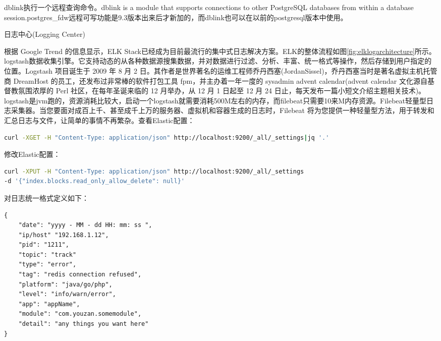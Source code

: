 \documentclass[8pt]{book}
\makeatletter
\numberwithin{dummy}{section}
\theoremstyle{ocrenumbox}
\theoremstyle{blacknumex}
\theoremstyle{blacknumbox}
\theoremstyle{ocrenum}
\renewcommand{\section}{\@startsection{section}{1}{\z@}
	{-4ex \@plus -1ex \@minus -.4ex}
	{1ex \@plus.2ex }
	{\normalfont\large\sffamily\bfseries}}
\makeatother
\begin{document}
dblink执行一个远程查询命令。dblink is a module that supports connections to other PostgreSQL databases from within a database session.postgres\_fdw远程可写功能是9.3版本出来后才新加的，而dblink也可以在以前的postgresql版本中使用。



\section{日志中心(Logging Center)}

根据 Google Trend 的信息显示，ELK Stack已经成为目前最流行的集中式日志解决方案。ELK的整体流程如图\ref{fig:elklogarchitecture}所示。logstash数据收集引擎。它支持动态的从各种数据源搜集数据，并对数据进行过滤、分析、丰富、统一格式等操作，然后存储到用户指定的位置。Logstash 项目诞生于 2009 年 8 月 2 日。其作者是世界著名的运维工程师乔丹西塞(JordanSissel)，乔丹西塞当时是著名虚拟主机托管商 DreamHost 的员工，还发布过非常棒的软件打包工具 fpm，并主办着一年一度的 sysadmin advent calendar(advent calendar 文化源自基督教氛围浓厚的 Perl 社区，在每年圣诞来临的 12 月举办，从 12 月 1 日起至 12 月 24 日止，每天发布一篇小短文介绍主题相关技术)。logstash是jvm跑的，资源消耗比较大，启动一个logstash就需要消耗500M左右的内存，而filebeat只需要10来M内存资源。Filebeat轻量型日志采集器。当您要面对成百上千、甚至成千上万的服务器、虚拟机和容器生成的日志时，Filebeat 将为您提供一种轻量型方法，用于转发和汇总日志与文件，让简单的事情不再繁杂。查看Elastic配置：

\begin{lstlisting}[language=Bash]
curl -XGET -H "Content-Type: application/json" http://localhost:9200/_all/_settings|jq '.'
\end{lstlisting}

修改Elastic配置：

\begin{lstlisting}[language=Bash]
curl -XPUT -H "Content-Type: application/json" http://localhost:9200/_all/_settings 
-d '{"index.blocks.read_only_allow_delete": null}'
\end{lstlisting}

对日志统一格式定义如下：


\begin{lstlisting}
{
	"date": "yyyy - MM - dd HH: mm: ss ",
	"ip/host" "192.168.1.12",
	"pid": "1211",
	"topic": "track"
	"type": "error",
	"tag": "redis connection refused",
	"platform": "java/go/php",
	"level": "info/warn/error",
	"app": "appName",
	"module": "com.youzan.somemodule",
	"detail": "any things you want here"
}
\end{lstlisting}
\end{document}

